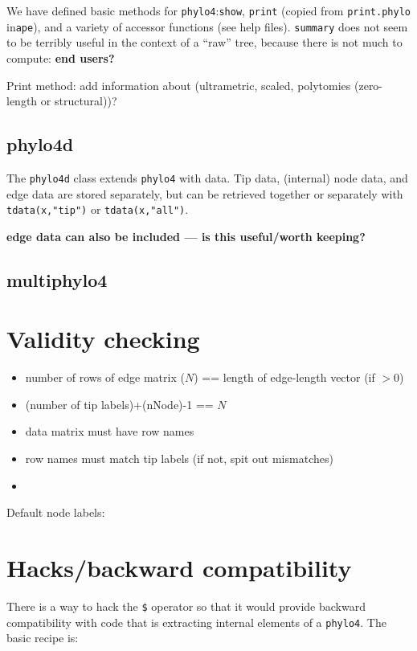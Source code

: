 \documentclass{article}
\newcommand{\code}[1]{{{\tt #1}}}
\begin{document}
We have defined basic methods for \code{phylo4}:\code{show}, \code{print} (copied from \code{print.phylo} in\code{ape}), and a variety of accessor functions (see help files). \code{summary} does not seem to be terribly useful in the context of a ``raw'' tree, because there is not much to compute: \textbf{end users?}

Print method: add information about (ultrametric, scaled, polytomies (zero-length or structural))?

\subsection{phylo4d}

The \code{phylo4d} class extends \code{phylo4} with data.  Tip data, (internal) node data, and edge data are stored separately, but can be retrieved together or separately with \code{tdata(x,"tip")} or \code{tdata(x,"all")}.

\textbf{edge data can also be included --- is this
useful/worth keeping?}

\subsection{multiphylo4}

\section{Validity checking}

\begin{itemize}
\item number of rows of edge matrix ($N$) == length of edge-length vector (if $>0$)
\item (number of tip labels)+(nNode)-1 == $N$
\item data matrix must have row names
\item row names must match tip labels (if not, spit out mismatches)
\item 
\end{itemize}
 
Default node labels:

\section{Hacks/backward compatibility}

There is a way to hack the \verb+$+ operator so that it would provide backward compatibility with code that is extracting internal elements of a \code{phylo4}. The basic recipe is: 
\end{document}
